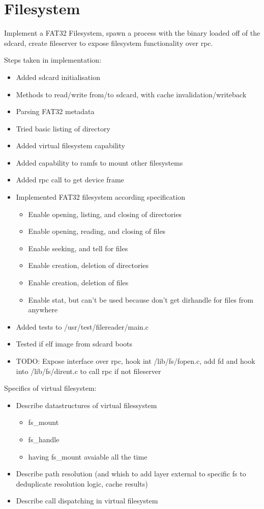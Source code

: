 \chapter{Filesystem}

Implement a FAT32 Filesystem, spawn a process with the binary loaded off of the sdcard, create fileserver to expose filesystem functionality over rpc.

Steps taken in implementation:
\begin{itemize}
	\item Added sdcard initialisation
	\item Methods to read/write from/to sdcard, with cache invalidation/writeback
	\item Parsing FAT32 metadata
	\item Tried basic listing of directory
	\item Added virtual filesystem capability
	\item Added capability to ramfs to mount other filesystems
	\item Added rpc call to get device frame
	\item Implemented FAT32 filesystem according specification
	\begin{itemize}
		\item Enable opening, listing, and closing of directories
		\item Enable opening, reading, and closing of files
		\item Enable seeking, and tell for files
		\item Enable creation, deletion of directories
		\item Enable creation, deletion of files
		\item Enable stat, but can't be used because don't get dirhandle for files from anywhere
	\end{itemize}
	\item Added tests to /usr/test/filereader/main.c
	\item Tested if elf image from sdcard boots
	\item TODO: Expose interface over rpc, hook int /lib/fs/fopen.c, add fd and hook into /lib/fs/dirent.c to call rpc if not fileserver
\end{itemize}

Specifics of virtual filesystem:
\begin{itemize}
	\item Describe datastructures of virtual filessystem
	\begin{itemize}
		\item fs\_mount
		\item fs\_handle
		\item having fs\_mount avaiable all the time
	\end{itemize}
	\item Describe path resolution (and whish to add layer external to specific fs to deduplicate resolution logic, cache results)
	\item Describe call dispatching in virtual filesystem
\end{itemize}

